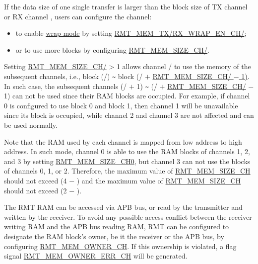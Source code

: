 \documentclass[main\_\_EN.tex]{subfiles}
\begin{document}
If the data size of one single transfer is larger than the block size of TX channel  or RX channel , users can configure the channel:
\begin{itemize}
    \item to enable \hyperref[sec:wrap-tx-mode]{wrap mode} by setting \hyperref[fielddesc:RMTMEMTXWRAPENCHN]{RMT\_MEM\_TX/RX\_WRAP\_EN\_CH/};
    \item or to use more blocks by configuring \hyperref[fielddesc:RMTMEMSIZECHN]{RMT\_MEM\_SIZE\_CH/}.
\end{itemize}

Setting \hyperref[fielddesc:RMTMEMSIZECHN]{RMT\_MEM\_SIZE\_CH/} > 1 allows channel / to use the memory of the subsequent channels, i.e., block (/) \verb+~+ block (/ $+$ \hyperref[fielddesc:RMTMEMSIZECHN]{RMT\_MEM\_SIZE\_CH/ $-$ 1)}. In such case, the subsequent channels (/ $+$ 1) \verb+~+ (/ $+$ \hyperref[fielddesc:RMTMEMSIZECHN]{RMT\_MEM\_SIZE\_CH/} $-$ 1) can not be used since their RAM blocks are occupied. For example, if channel 0 is configured to use block 0 and block 1, then channel 1 will be unavailable since its block is occupied, while channel 2 and channel 3 are not affected and can be used normally.

Note that the RAM used by each channel is mapped from low address to high address. In such mode, channel 0 is able to use the RAM blocks of channels 1, 2, and 3 by setting \hyperref[fielddesc:RMTMEMSIZECHN]{RMT\_MEM\_SIZE\_CH0}, but channel 3 can not use the blocks of channels 0, 1, or 2. Therefore, the maximum value of \hyperref[fielddesc:RMTMEMSIZECHN]{RMT\_MEM\_SIZE\_CH} should not exceed (4 $-$ ) and the maximum value of \hyperref[fielddesc:RMTMEMSIZECHM]{RMT\_MEM\_SIZE\_CH} should not exceed (2 $-$ ).

The RMT RAM can be accessed via APB bus, or read by the transmitter and written by the receiver. To avoid any possible access conflict between the receiver writing RAM and the APB bus reading RAM, RMT can be configured to designate the RAM block's owner, be it the receiver or the APB bus, by configuring \hyperref[fielddesc:RMTMEMOWNERCHM]{RMT\_MEM\_OWNER\_CH}. If this ownership is violated, a flag signal \hyperref[fielddesc:RMTMEMOWNERERRCHM]{RMT\_MEM\_OWNER\_ERR\_CH} will be generated. 
\end{document}
